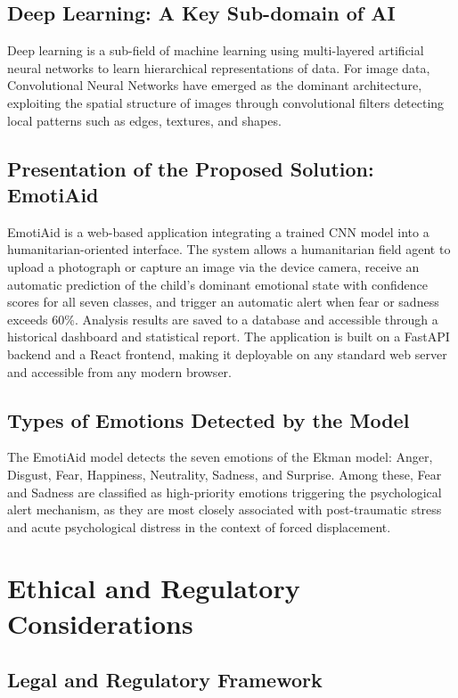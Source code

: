 \documentclass[a4paper,12pt,oneside]{report}
\begin{document}
\subsection{Deep Learning: A Key Sub-domain of AI}

Deep learning is a sub-field of machine learning using multi-layered artificial
neural networks to learn hierarchical representations of data. For image data,
Convolutional Neural Networks have emerged as the dominant architecture,
exploiting the spatial structure of images through convolutional filters detecting
local patterns such as edges, textures, and shapes.

\subsection{Presentation of the Proposed Solution: EmotiAid}

EmotiAid is a web-based application integrating a trained CNN model into a
humanitarian-oriented interface. The system allows a humanitarian field agent to
upload a photograph or capture an image via the device camera, receive an automatic
prediction of the child's dominant emotional state with confidence scores for all
seven classes, and trigger an automatic alert when fear or sadness exceeds 60\%.
Analysis results are saved to a database and accessible through a historical
dashboard and statistical report. The application is built on a FastAPI backend
and a React frontend, making it deployable on any standard web server and
accessible from any modern browser.

\subsection{Types of Emotions Detected by the Model}

The EmotiAid model detects the seven emotions of the Ekman model: Anger, Disgust,
Fear, Happiness, Neutrality, Sadness, and Surprise. Among these, Fear and Sadness
are classified as high-priority emotions triggering the psychological alert
mechanism, as they are most closely associated with post-traumatic stress and
acute psychological distress in the context of forced displacement.

\section{Ethical and Regulatory Considerations}

\subsection{Legal and Regulatory Framework}
\end{document}
